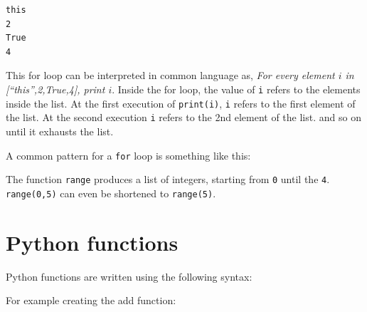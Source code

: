 \begin{verbatim}
this
2
True
4
\end{verbatim}

This for loop can be interpreted in common language as, \emph{For every
element \(i\) in {[}``this'',2,True,4{]}, print \(i\)}. Inside the for
loop, the value of \texttt{i} refers to the elements inside the list. At
the first execution of \texttt{print(i)}, \texttt{i} refers to the first
element of the list. At the second execution \texttt{i} refers to the
2nd element of the list. and so on until it exhausts the list.

A common pattern for a \texttt{for} loop is something like this:

\begin{Shaded}
\begin{Highlighting}[]
 \NormalTok{(}\NormalTok{,}\NormalTok{):}
\end{Highlighting}
\end{Shaded}

\begin{Shaded}
\begin{Highlighting}[]
\end{Highlighting}
\end{Shaded}

The function \texttt{range} produces a list of integers, starting from
\texttt{0} until the \texttt{4}. \texttt{range(0,5)} can even be
shortened to \texttt{range(5)}.

\section{Python
functions}\label{python-introduction.md__python-functions}

Python functions are written using the following syntax:

\begin{Shaded}
\begin{Highlighting}[]
\end{Highlighting}
\end{Shaded}

For example creating the add function:

\begin{Shaded}
\begin{Highlighting}[]
    \OperatorTok{+}
\end{Highlighting}
\end{Shaded}

